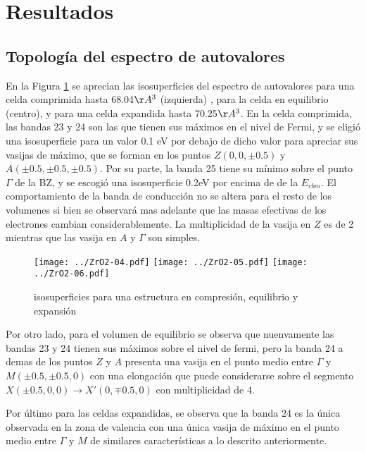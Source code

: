 \section{Resultados}

\subsection{Topología del espectro de autovalores}
En la Figura \ref{FigureIsosurfaces} se aprecian las isosuperficies del espectro de autovalores para
una celda comprimida hasta  68.04$\AA^3$ (izquierda) , para la celda en equilibrio (centro), y para una celda
expandida hasta 70.25$\AA^3$.  
En la celda comprimida, las bandas 23 y 24 son las que tienen sus máximos en el nivel de Fermi, 
y se eligió una isosuperficie para un valor 0.1 eV por debajo de dicho valor para apreciar sus vasijas de
máximo, que se forman en los puntos $Z (0, 0, \pm0.5)$ y $A (\pm0.5,\pm 0.5, \pm0.5)$. Por su parte, la 
banda 25 tiene su mínimo sobre el punto $\Gamma$ de la BZ, y se escogió una isosuperficie 0.2eV por 
encima de de la $E_{cbm}$. El comportamiento de la banda de conducción no se altera para 
el resto de los volumenes si bien se observará mas adelante que las masas efectivas de los electrones 
cambian considerablemente. La multiplicidad de la vasija en $Z$ es de 2 mientras que las
vasija en $A$ y $\Gamma$ son simples.

\begin{figure}
  \center %
  \texttt{[image: ../ZrO2-04.pdf]}
  \texttt{[image: ../ZrO2-05.pdf]}
  \texttt{[image: ../ZrO2-06.pdf]}
  \caption{\protect\label{FigureIsosurfaces}
  isosuperficies  para una estructura en compresión, equilibrio y expansión}
\end{figure}

Por otro lado, para el volumen de equilibrio se observa que nuenvamente las bandas  23 y 24 
tienen sus máximos sobre el nivel de fermi, pero la banda 24 a demas de los puntos $Z$ y $A$
presenta una vasija en el punto medio entre $\Gamma$ y $M (\pm0.5, \pm0.5, 0)$ con una 
elongación que puede considerarse sobre el segmento $X (\pm0.5, 0, 0) \rightarrow X' (0, \mp0.5, 0)$ con 
multiplicidad de 4. 

Por último para las celdas expandidas, se observa que la banda 24 es la única observada en 
la zona de valencia con una única vasija de máximo en el punto medio entre $\Gamma$ y $M$ de 
similares características a lo descrito anteriormente.

